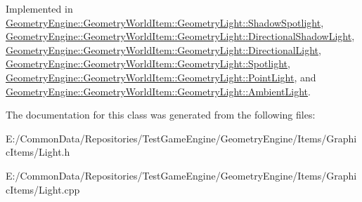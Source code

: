 Implemented in \mbox{\hyperlink{class_geometry_engine_1_1_geometry_world_item_1_1_geometry_light_1_1_shadow_spotlight_aea5bd6e9315d5df327f59d752f8c6f95}{Geometry\+Engine\+::\+Geometry\+World\+Item\+::\+Geometry\+Light\+::\+Shadow\+Spotlight}}, \mbox{\hyperlink{class_geometry_engine_1_1_geometry_world_item_1_1_geometry_light_1_1_directional_shadow_light_a9eb42440febb19231e71555f7fde2346}{Geometry\+Engine\+::\+Geometry\+World\+Item\+::\+Geometry\+Light\+::\+Directional\+Shadow\+Light}}, \mbox{\hyperlink{class_geometry_engine_1_1_geometry_world_item_1_1_geometry_light_1_1_directional_light_ae395d609ee47dd5d399514bb2c76d2db}{Geometry\+Engine\+::\+Geometry\+World\+Item\+::\+Geometry\+Light\+::\+Directional\+Light}}, \mbox{\hyperlink{class_geometry_engine_1_1_geometry_world_item_1_1_geometry_light_1_1_spotlight_a89686934756cc47dd810cc43d8f5f88a}{Geometry\+Engine\+::\+Geometry\+World\+Item\+::\+Geometry\+Light\+::\+Spotlight}}, \mbox{\hyperlink{class_geometry_engine_1_1_geometry_world_item_1_1_geometry_light_1_1_point_light_acf3ebd411b36d95ba26ae41bcc25793a}{Geometry\+Engine\+::\+Geometry\+World\+Item\+::\+Geometry\+Light\+::\+Point\+Light}}, and \mbox{\hyperlink{class_geometry_engine_1_1_geometry_world_item_1_1_geometry_light_1_1_ambient_light_a37469f72317d3d9cd0e5fb46fbf5fedf}{Geometry\+Engine\+::\+Geometry\+World\+Item\+::\+Geometry\+Light\+::\+Ambient\+Light}}.



The documentation for this class was generated from the following files\+:\begin{DoxyCompactItemize}
\item 
E\+:/\+Common\+Data/\+Repositories/\+Test\+Game\+Engine/\+Geometry\+Engine/\+Items/\+Graphic\+Items/Light.\+h\item 
E\+:/\+Common\+Data/\+Repositories/\+Test\+Game\+Engine/\+Geometry\+Engine/\+Items/\+Graphic\+Items/Light.\+cpp\end{DoxyCompactItemize}
